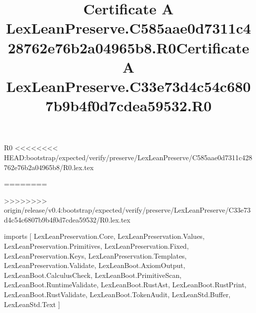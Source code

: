 \begin{lexlean}{R0}
<<<<<<<< HEAD:bootstrap/expected/verify/preserve/LexLeanPreserve/C585aae0d7311c428762e76b2a04965b8/R0.lex.tex
\title{Certificate A LexLeanPreserve.C585aae0d7311c428762e76b2a04965b8.R0}
========
\title{Certificate A LexLeanPreserve.C33e73d4c54c6807b9b4f0d7cdea59532.R0}
>>>>>>>> origin/release/v0.4:bootstrap/expected/verify/preserve/LexLeanPreserve/C33e73d4c54c6807b9b4f0d7cdea59532/R0.lex.tex
\begin{coremodule}
imports [
  LexLeanPreservation.Core,
  LexLeanPreservation.Values,
  LexLeanPreservation.Primitives,
  LexLeanPreservation.Fixed,
  LexLeanPreservation.Keys,
  LexLeanPreservation.Templates,
  LexLeanPreservation.Validate,
  LexLeanBoot.AxiomOutput,
  LexLeanBoot.CalculusCheck,
  LexLeanBoot.PrimitiveScan,
  LexLeanBoot.RuntimeValidate,
  LexLeanBoot.RustAst,
  LexLeanBoot.RustPrint,
  LexLeanBoot.RustValidate,
  LexLeanBoot.TokenAudit,
  LexLeanStd.Buffer,
  LexLeanStd.Text
]


\end{coremodule}
\end{lexlean}
